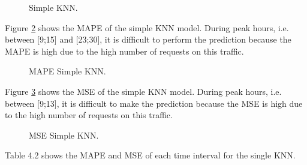 \begin{figure}[!h]
	\begin{center}
	\end{center}
	\caption{Simple KNN.}
	\label{Simple KNN}
\end{figure} 


Figure \ref{MAPE Simple KNN} shows the MAPE of the simple KNN model. During peak hours, i.e. between [9;15] and [23;30], it is difficult to perform the prediction because the MAPE is high due to the high number of requests on this traffic.


\begin{figure}[!h]
	\begin{center}
	\end{center}
	\caption{MAPE Simple KNN.}
	\label{MAPE Simple KNN}
\end{figure} 

Figure \ref{MSE Simple KNN} shows the MSE of the simple KNN model. During peak hours, i.e. between [9;13], it is difficult to make the prediction because the MSE is high due to the high number of requests on this traffic.

\begin{figure}[!h]
	\begin{center}
	\end{center}
	\caption{MSE Simple KNN.}
	\label{MSE Simple KNN}
\end{figure}

Table 4.2 shows the MAPE and MSE of each time interval for the single KNN.

